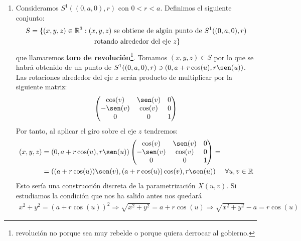 \begin{ejemplo}
\begin{enumerate}
        Si la cuádrica $S$ no tiene punto singulares (los tiene en el infinito) y no es vacía, entonces es una superficie de $\bb{R}^3$. Esto nos dice que los elipsoides, hiperboloides, paraboloides, cilindros y planos son superficies. Nos quedarían fuera los conos y los planos secantes, que en principio no podremos concluir nada con el ejemplo anterior.

        \item Consideramos $S^1((0,a,0), r)$ con $0<r<a$. Definimos el siguiente conjunto:
        \begin{gather*}
            S = \{(x,y,z)\in \mathbb{R}^3 : (x,y,z) \text{ se obtiene de algún punto de }S^1((0,a,0), r)\\
            \text{ rotando alrededor del eje }z\}
        \end{gather*}
        que llamaremos \textbf{toro de revolución}\footnote{revolución no porque sea muy rebelde o porque quiera derrocar al gobierno.}. Tomamos $(x,y,z)\in S$ por lo que se habrá obtenido de un punto de $S^1((0,a,0), r)\owns (0,a+r\cos(u), r\sen(u))$. Las rotaciones alrededor del eje $z$ serán producto de multiplicar por la siguiente matriz:
        \begin{gather*}
            \begin{pmatrix}
                \cos(v) & \sen(v) & 0\\
                -\sen(v) & \cos(v) & 0\\
                0 & 0 & 1
            \end{pmatrix}
        \end{gather*}
        Por tanto, al aplicar el giro sobre el eje $z$ tendremos:
        \begin{align*}
            (x,y,z) &= (0,a+r\cos(u), r\sen(u)) \begin{pmatrix}
                \cos(v) & \sen(v) & 0\\
                -\sen(v) & \cos(v) & 0\\
                0 & 0 & 1
            \end{pmatrix}
            =\\ &=((a+r\cos(u))\sen(v), (a+r\cos(u))\cos(v), r\sen(u)) \ \ \ \ \forall u,v\in \bb{R}
        \end{align*}
        Esto sería una construcción discreta de la parametrización $X(u,v)$. Si estudiamos la condición que nos ha salido antes nos quedará
        \begin{gather*}
            x^2 + y^2 = (a+r\cos(u))^2 \Rightarrow \sqrt{x^2 + y^2} = a+r\cos(u) \Rightarrow \sqrt{x^2 + y^2} -a = r\cos(u)

\end{gather*}
\end{enumerate}
\end{ejemplo}
